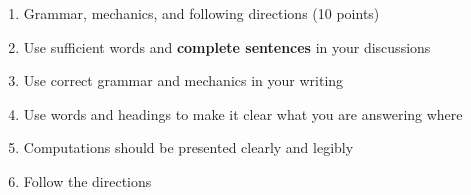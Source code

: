 \begin{enumerate}
 \item Grammar, mechanics, and following directions (10 points)
\bi
\item Use sufficient words and \textbf{complete sentences} in your discussions
\item Use correct grammar and mechanics in your writing
\item Use words and headings to make it clear what you are answering where
\item Computations should be presented clearly and legibly
\item Follow the directions
\ei

\ee

%  
  

\end{enumerate}
